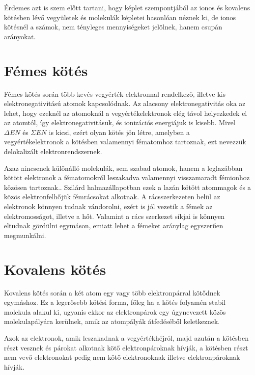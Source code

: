 \documentclass[colorlinks]{thesis-ekf}
\theoremstyle{definition}
\theoremstyle{remark}
\begin{document}
Érdemes azt is szem előtt tartani, hogy képlet szempontjából az ionos és kovalens kötésben lévő vegyületek és molekulák képletei hasonlóan néznek ki, de ionos kötésnél a számok, nem tényleges mennyiségeket jelölnek, hanem csupán arányokat.\cite{ionos_vidi}
\section{Fémes kötés}

Fémes kötés során több kevés vegyérték elektronnal rendelkező, illetve kis elektronegativitású atomok kapcsolódnak. Az alacsony elektronegativitás oka az lehet, hogy ezeknél az atomoknál a vegyértékelektronok elég távol helyezkedek el az atomtól, így elektronegativitásuk, és ionizációs energiájuk is kisebb. Mivel \begin{math}\Delta EN\end{math} és \begin{math}\Sigma EN\end{math} is kicsi, ezért olyan kötés jön létre, amelyben a vegyértékelektronok a kötésben valamennyi fématomhoz tartoznak, ezt nevezzük delokalizált elektronrendszernek.\cite{miskolc_kemia}

Azaz nincsenek különálló molekulák, sem szabad atomok, hanem a leglazábban kötött elektronok a fématomokról leszakadva valamennyi visszamaradt fémionhoz közösen tartoznak.\cite{eke_kemia_ppt}. Szilárd halmazállapotban ezek a lazán kötött atommagok és a közös elektronfelhőjük fémrácsokat alkotnak. A rácsszerkezeten belül az elektronok könnyen tudnak vándorolni, ezért is jól vezetik a fémek az elektromosságot, illetve a hőt.\cite{wiki_femes} Valamint a rács szerkezet síkjai is könnyen eltudnak gördülni egymáson, emiatt lehet a fémeket aránylag egyszerűen megmunkálni.

\section{Kovalens kötés}
Kovalens kötés során a két atom egy vagy több elektronpárral kötődnek egymáshoz.\cite{eke_kemia_ppt} Ez a legerősebb kötési forma, főleg ha a kötés folyamén stabil molekula alakul ki, ugyanis ekkor az elektronpárok egy úgynevezett közös molekulapályára kerülnek\cite{miskolc_kemia}, amik az atompályák átfedéséből keletkeznek.\cite{eke_kemia_ppt}

Azok az elektronok, amik leszakadnak a vegyértékhéjról, majd azután a kötésben részt vesznek és párokat alkotnak kötő elektronpároknak hívják, a kötésben részt nem vevő elektronokat pedig nem kötő elektronoknak illetve elektronpároknak hívják.\cite{eke_kemia_ppt}
\end{document}
